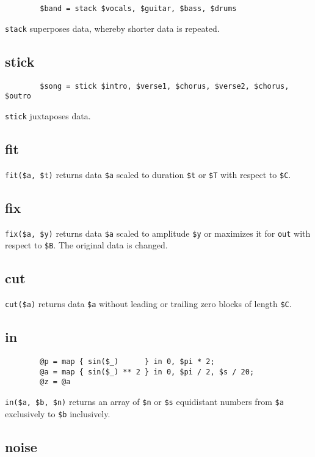 \documentclass[a4paper, 10pt]{article}
\begin{document}
	\begin{verbatim}
		$band = stack $vocals, $guitar, $bass, $drums
	\end{verbatim}
	\verb|stack| superposes data, whereby shorter data is repeated.
	
	\subsection*{stick}
	
	\begin{verbatim}
		$song = stick $intro, $verse1, $chorus, $verse2, $chorus, $outro
	\end{verbatim}
	\verb|stick| juxtaposes data.
	
	\subsection*{fit}
	
	\verb|fit($a, $t)| returns data \verb|$a| scaled to duration \verb|$t| or \verb|$T| with respect to \verb|$C|.
	
	\subsection*{fix}
	
	\verb|fix($a, $y)| returns data \verb|$a| scaled to amplitude \verb|$y| or maximizes it for \verb|out| with respect to \verb|$B|. The original data is changed.
	
	\subsection*{cut}
	
	\verb|cut($a)| returns data \verb|$a| without leading or trailing zero blocks of length \verb|$C|.
	
	\subsection*{in}
	
	\begin{verbatim}
		@p = map { sin($_)      } in 0, $pi * 2;
		@a = map { sin($_) ** 2 } in 0, $pi / 2, $s / 20;
		@z = @a
	\end{verbatim}
	\verb|in($a, $b, $n)| returns an array of \verb|$n| or \verb|$s| equidistant numbers from \verb|$a| exclusively to \verb|$b| inclusively.
	
	\subsection*{noise}	
	
\end{document}
